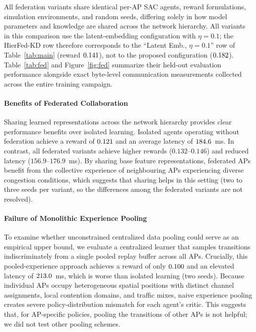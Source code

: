 All federation variants share identical per-AP SAC agents, reward formulations, simulation environments, and random seeds, differing solely in how model parameters and knowledge are shared across the network hierarchy. All variants in this comparison use the latent-embedding configuration with $\eta=0.1$; the HierFed-KD row therefore corresponds to the ``Latent Emb., $\eta{=}0.1$'' row of Table~\ref{tab:main} (reward $0.141$), not to the proposed configuration ($0.182$). Table~\ref{tab:fed} and Figure~\ref{fig:fed} summarize their held-out evaluation performance alongside exact byte-level communication measurements collected across the entire training campaign.

\paragraph{Benefits of Federated Collaboration} 
Sharing learned representations across the network hierarchy provides clear performance benefits over isolated learning. Isolated agents operating without federation achieve a reward of $0.121$ and an average latency of $184.6$~ms. In contrast, all federated variants achieve higher rewards ($0.132$--$0.146$) and reduced latency ($156.9$--$176.9$~ms). By sharing base feature representations, federated APs benefit from the collective experience of neighbouring APs experiencing diverse congestion conditions, which suggests that sharing helps in this setting (two to three seeds per variant, so the differences among the federated variants are not resolved).

\paragraph{Failure of Monolithic Experience Pooling} 
To examine whether unconstrained centralized data pooling could serve as an empirical upper bound, we evaluate a centralized learner that samples transitions indiscriminately from a single pooled replay buffer across all APs. Crucially, this pooled-experience approach achieves a reward of only $0.100$ and an elevated latency of $213.0$~ms, which is worse than isolated learning (two seeds). Because individual APs occupy heterogeneous spatial positions with distinct channel assignments, local contention domains, and traffic mixes, naive experience pooling creates severe policy-distribution mismatch for each agent's critic. This suggests that, for AP-specific policies, pooling the transitions of other APs is not helpful; we did not test other pooling schemes.

